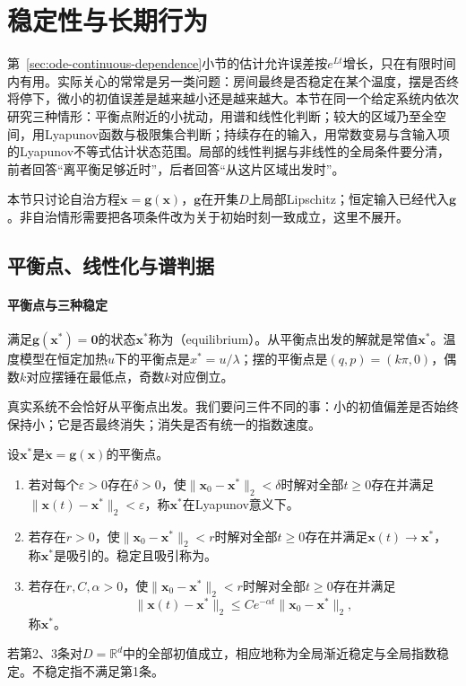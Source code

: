 
\section{稳定性与长期行为}
\label{sec:ode-stability}

第~\ref{sec:ode-continuous-dependence}小节的估计允许误差按$e^{Lt}$增长，只在有限时间内有用。实际关心的常常是另一类问题：房间最终是否稳定在某个温度，摆是否终将停下，微小的初值误差是越来越小还是越来越大。本节在同一个给定系统内依次研究三种情形：平衡点附近的小扰动，用谱和线性化判断；较大的区域乃至全空间，用Lyapunov函数与极限集合判断；持续存在的输入，用常数变易与含输入项的Lyapunov不等式估计状态范围。局部的线性判据与非线性的全局条件要分清，前者回答“离平衡足够近时”，后者回答“从这片区域出发时”。

本节只讨论自治方程$\dot{\bm x}=\bm g(\bm x)$，$\bm g$在开集$D$上局部Lipschitz；恒定输入已经代入$\bm g$。非自治情形需要把各项条件改为关于初始时刻一致成立，这里不展开。

\subsection{平衡点、线性化与谱判据}
\label{sec:ode-linear-stability}

\paragraph{平衡点与三种稳定}
满足$\bm g(\bm x^\ast)=\bm0$的状态$\bm x^\ast$称为（equilibrium）。从平衡点出发的解就是常值$\bm x^\ast$。温度模型在恒定加热$u$下的平衡点是$x^\ast=u/\lambda$；摆的平衡点是$(q,p)=(k\pi,0)$，偶数$k$对应摆锤在最低点，奇数$k$对应倒立。

真实系统不会恰好从平衡点出发。我们要问三件不同的事：小的初值偏差是否始终保持小；它是否最终消失；消失是否有统一的指数速度。

\begin{definition}[平衡点的稳定性]
  \label{def:ode-equilibrium-stability}
  设$\bm x^\ast$是$\dot{\bm x}=\bm g(\bm x)$的平衡点。
  \begin{enumerate}
    \item 若对每个$\varepsilon>0$存在$\delta>0$，使$\|\bm x_0-\bm x^\ast\|_2<\delta$时解对全部$t\geq0$存在并满足$\|\bm x(t)-\bm x^\ast\|_2<\varepsilon$，称$\bm x^\ast$在Lyapunov意义下。
    \item 若存在$r>0$，使$\|\bm x_0-\bm x^\ast\|_2<r$时解对全部$t\geq0$存在并满足$\bm x(t)\to\bm x^\ast$，称$\bm x^\ast$是吸引的。稳定且吸引称为。
    \item 若存在$r,C,\alpha>0$，使$\|\bm x_0-\bm x^\ast\|_2<r$时解对全部$t\geq0$存在并满足
    \[
      \|\bm x(t)-\bm x^\ast\|_2\leq Ce^{-\alpha t}\|\bm x_0-\bm x^\ast\|_2,
    \]
    称$\bm x^\ast$。
  \end{enumerate}
  若第2、3条对$D=\mathbb R^d$中的全部初值成立，相应地称为全局渐近稳定与全局指数稳定。不稳定指不满足第1条。
\end{definition}

